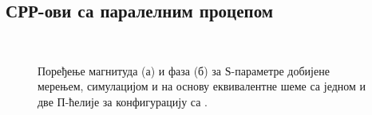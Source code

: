 \subsection{СРР-ови са паралелним процепом}

\begin{figure}[!t]
\centering
{}\\
\caption{Поређење магнитуда (а) и фаза (б) за $Ѕ$-параметре добијене мерењем, симулацијом и на основу еквивалентне шеме са једном и две П-ћелије за конфигурацију са .}\label{f10}
\end{figure}
